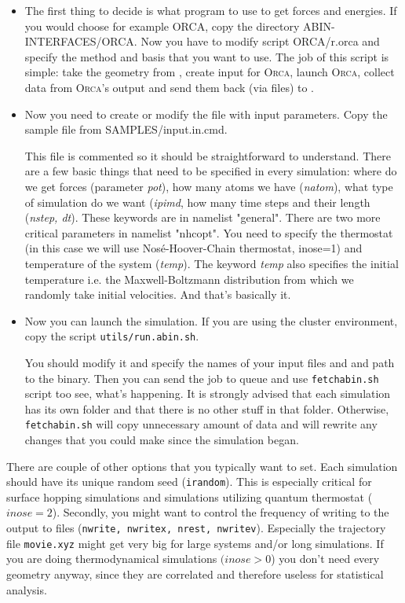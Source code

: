 \begin{itemize}

\item The first thing to decide is what program to use to get forces and energies. If you would choose for example ORCA, copy the directory
ABIN-INTERFACES/ORCA. Now you have to modify script ORCA/r.orca and specify the method and basis that you want to use. The job of this script is simple: take the geometry from \abin, create input for \textsc{Orca}, launch \textsc{Orca}, collect data from \textsc{Orca}'s output and send them back (via files) to \abin.

\item Now you need to create or modify the file with input parameters. Copy the sample file from SAMPLES/input.in.cmd.

This file is commented so it should be straightforward to understand. There are a few basic things that need to be specified in every simulation: where do we get forces (parameter \textit{pot}), how many atoms we have (\textit{natom}), what type of simulation do we want (\textit{ipimd}, how many time steps and their length (\textit{nstep, dt}). These keywords are in namelist "general". There are two more critical parameters in namelist "nhcopt". You need to specify the thermostat (in this case we will use Nosé-Hoover-Chain thermostat, inose=1)
and temperature of the system (\textit{temp}). The keyword \textit{temp} also specifies the initial temperature i.e. the Maxwell-Boltzmann distribution from which we randomly take initial velocities. And that's basically it.

\item Now you can launch the simulation. If you are using the cluster environment, copy the script \texttt{utils/run.abin.sh}.

You should modify it and specify the names of your input files and and path to the \abin binary. Then you can send the job to queue and use \texttt{fetchabin.sh} script too see, what's happening. It is strongly advised that each simulation has its own folder and that there is no other stuff in that folder. Otherwise, \texttt{fetchabin.sh} will copy unnecessary amount of data and will rewrite any changes that you could make since the simulation began. 

\end{itemize}

There are couple of other options that you typically want to set. Each simulation should have its unique random seed (\texttt{irandom}). This is especially critical for surface hopping simulations and simulations utilizing quantum thermostat ($inose=2$). Secondly, you might want to control the frequency of writing to the output to files (\texttt{nwrite, nwritex, nrest, nwritev}). Especially the trajectory file \texttt{movie.xyz} might get very big for large systems and/or long simulations. If you are doing thermodynamical simulations $(inose > 0$) you don't need every geometry anyway, since they are correlated and therefore useless for statistical analysis.

